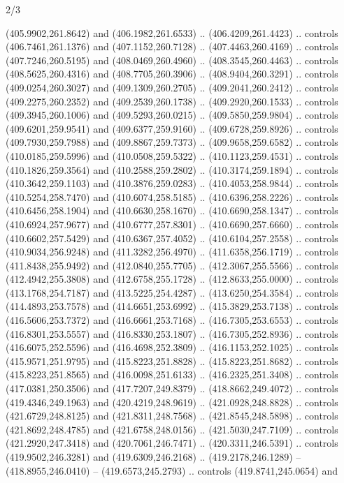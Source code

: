 \begin{flagdescription}{2/3}
\begin{scope}[xshift=0.5\flaglength,yshift=0.5\flagwidth,scale=\flagwidth/495.65]
\begin{scope}[y=0.8pt, x=0.8pt, yscale=-1,shift={(-463.76,-309.78)}]
  (405.9902,261.8642) and (406.1982,261.6533) .. (406.4209,261.4423) .. controls
  (406.7461,261.1376) and (407.1152,260.7128) .. (407.4463,260.4169) .. controls
  (407.7246,260.5195) and (408.0469,260.4960) .. (408.3545,260.4463) .. controls
  (408.5625,260.4316) and (408.7705,260.3906) .. (408.9404,260.3291) .. controls
  (409.0254,260.3027) and (409.1309,260.2705) .. (409.2041,260.2412) .. controls
  (409.2275,260.2352) and (409.2539,260.1738) .. (409.2920,260.1533) .. controls
  (409.3945,260.1006) and (409.5293,260.0215) .. (409.5850,259.9804) .. controls
  (409.6201,259.9541) and (409.6377,259.9160) .. (409.6728,259.8926) .. controls
  (409.7930,259.7988) and (409.8867,259.7373) .. (409.9658,259.6582) .. controls
  (410.0185,259.5996) and (410.0508,259.5322) .. (410.1123,259.4531) .. controls
  (410.1826,259.3564) and (410.2588,259.2802) .. (410.3174,259.1894) .. controls
  (410.3642,259.1103) and (410.3876,259.0283) .. (410.4053,258.9844) .. controls
  (410.5254,258.7470) and (410.6074,258.5185) .. (410.6396,258.2226) .. controls
  (410.6456,258.1904) and (410.6630,258.1670) .. (410.6690,258.1347) .. controls
  (410.6924,257.9677) and (410.6777,257.8301) .. (410.6690,257.6660) .. controls
  (410.6602,257.5429) and (410.6367,257.4052) .. (410.6104,257.2558) .. controls
  (410.9034,256.9248) and (411.3282,256.4970) .. (411.6358,256.1719) .. controls
  (411.8438,255.9492) and (412.0840,255.7705) .. (412.3067,255.5566) .. controls
  (412.4942,255.3808) and (412.6758,255.1728) .. (412.8633,255.0000) .. controls
  (413.1768,254.7187) and (413.5225,254.4287) .. (413.6250,254.3584) .. controls
  (414.4893,253.7578) and (414.6651,253.6992) .. (415.3829,253.7138) .. controls
  (416.5606,253.7372) and (416.6661,253.7168) .. (416.7305,253.6553) .. controls
  (416.8301,253.5557) and (416.8330,253.1807) .. (416.7305,252.8936) .. controls
  (416.6075,252.5596) and (416.4698,252.3809) .. (416.1153,252.1025) .. controls
  (415.9571,251.9795) and (415.8223,251.8828) .. (415.8223,251.8682) .. controls
  (415.8223,251.8565) and (416.0098,251.6133) .. (416.2325,251.3408) .. controls
  (417.0381,250.3506) and (417.7207,249.8379) .. (418.8662,249.4072) .. controls
  (419.4346,249.1963) and (420.4219,248.9619) .. (421.0928,248.8828) .. controls
  (421.6729,248.8125) and (421.8311,248.7568) .. (421.8545,248.5898) .. controls
  (421.8692,248.4785) and (421.6758,248.0156) .. (421.5030,247.7109) .. controls
  (421.2920,247.3418) and (420.7061,246.7471) .. (420.3311,246.5391) .. controls
  (419.9502,246.3281) and (419.6309,246.2168) .. (419.2178,246.1289) --
  (418.8955,246.0410) -- (419.6573,245.2793) .. controls (419.8741,245.0654) and

\end{scope}
\end{scope}
\end{flagdescription}
